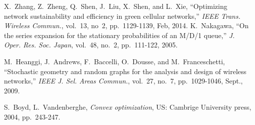 \documentclass[12pt, draftclsnofoot,onecolumn]{IEEEtran}
\begin{document}
\begin{thebibliography}{100}
     X.~Zhang, Z.~Zheng, Q.~Shen, J.~Liu, X.~Shen, and L.~Xie, ``Optimizing network sustainability and efficiency in green cellular networks,'' \emph{IEEE Trans. Wireless Commun.}, vol.~13, no~2, pp.~1129-1139, Feb, 2014.
     K.~Nakagawa, ``On the series expansion for the stationary probabilities of an M/D/1 queue,'' \emph{J. Oper. Res. Soc. Japan}, vol.~48, no.~2, pp.~111-122, 2005.

	 M.~Heanggi, J.~Andrews, F.~Baccelli, O.~Dousse, and M.~Franceschetti, ``Stochastic geometry and random graphs for the analysis and design of wireless networks,'' \emph{IEEE J. Sel. Areas Commun.}, vol.~27, no.~7, pp.~1029-1046, Sept., 2009.

     S.~Boyd, L.~Vandenberghe, \emph{Convex optimization}, US: Cambrige University press, 2004, pp.~243-247.

\end{thebibliography}
\end{document}

